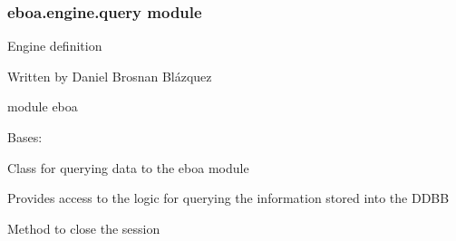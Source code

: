 \subsubsection{eboa.engine.query module}
\label{\detokenize{eboa.engine:module-eboa.engine.query}}\label{\detokenize{eboa.engine:eboa-engine-query-module}}
Engine definition

Written by Daniel Brosnan Blázquez

module eboa

\begin{fulllineitems}
\label{\detokenize{eboa.engine:eboa.engine.query.Query}}
Bases: 

Class for querying data to the eboa module

Provides access to the logic for querying
the information stored into the DDBB

\begin{fulllineitems}
\label{\detokenize{eboa.engine:eboa.engine.query.Query.clear_db}}
\end{fulllineitems}


\begin{fulllineitems}
\label{\detokenize{eboa.engine:eboa.engine.query.Query.close_session}}
Method to close the session

\end{fulllineitems}


\begin{fulllineitems}
\label{\detokenize{eboa.engine:eboa.engine.query.Query.delete}}
\end{fulllineitems}


\end{fulllineitems}
